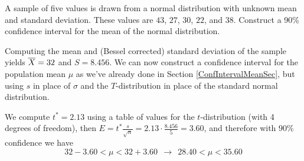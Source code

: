 \par
\begin{examp}\label{TIntExample} A sample of five values is drawn from a normal distribution with unknown mean and standard deviation. These values are $43$, $27$, $30$, $22$, and $38$. Construct a 90\% confidence interval for the mean of the normal distribution.
\par
\noindent Computing the mean and (Bessel corrected) standard deviation of the sample yields ${\overline{X}} = 32$ and $S = 8.456$. We can now construct a confidence interval for the population mean $\mu$ as we've already done in Section \ref{ConfIntervalMeanSec}, but using $s$ in place of $\sigma$ and the $T$-distribution in place of the standard normal distribution.
\begin{center}
\end{center}
\noindent We compute $t^* = 2.13$ using a table of values for the $t$-distribution (with 4 degrees of freedom), then $E = t^{*} \frac{s}{\sqrt{n}} = 2.13 \cdot \frac{8.456}{5} = 3.60$, and therefore with $90\%$ confidence we have
$$32 - 3.60 < \mu < 32 + 3.60 \ \ \rightarrow \ \ 28.40 < \mu < 35.60$$
\end{examp}


